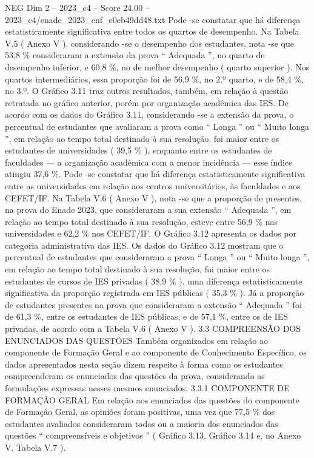 \begin{textsample}{NEG Dim 2 – 2023\_c4 – Score 24.00 – 2023\_c4/enade\_2023\_enf\_e0eb49dd48.txt}
Pode -se constatar que há diferença estatisticamente significativa entre todos os quartos de desempenho.
Na Tabela V.5 ( Anexo V ), considerando -se o desempenho dos estudantes, nota -se que 53,8 \% consideraram a extensão da prova “ Adequada ”, no quarto de desempenho inferior, e 60,8 \%, no de melhor desempenho ( quarto superior ).
Nos quartos intermediários, essa proporção foi de 56,9 \%, no 2.º quarto, e de 58,4 \%, no 3.º.
O Gráfico 3.11 traz outros resultados, também, em relação à questão retratada no gráfico anterior, porém por organização acadêmica das IES.
De acordo com os dados do Gráfico 3.11, considerando -se a extensão da prova, o percentual de estudantes que avaliaram a prova como “ Longa ” ou “ Muito longa ”, em relação ao tempo total destinado à sua resolução, foi maior entre os estudantes de universidades ( 39,5 \% ), enquanto entre os estudantes de faculdades — a organização acadêmica com a menor incidência — esse índice atingiu 37,6 \%.
Pode -se constatar que há diferença estatisticamente significativa entre as universidades em relação aos centros universitários, às faculdades e aos CEFET/IF.
Na Tabela V.6 ( Anexo V ), nota -se que a proporção de presentes, na prova do Enade 2023, que consideraram a sua extensão “ Adequada ”, em relação ao tempo total destinado à sua resolução, esteve entre 56,9 \% nas universidades e 62,2 \% nos CEFET/IF.
O Gráfico 3.12 apresenta os dados por categoria administrativa das IES.
Os dados do Gráfico 3.12 mostram que o percentual de estudantes que consideraram a prova “ Longa ” ou “ Muito longa ”, em relação ao tempo total destinado à sua resolução, foi maior entre os estudantes de cursos de IES privadas ( 38,9 \% ), uma diferença estatisticamente significativa da proporção registrada em IES públicas ( 35,3 \% ).
Já a proporção de estudantes presentes na prova que consideraram a extensão “ Adequada ” foi de 61,3 \%, entre os estudantes de IES públicas, e de 57,1 \%, entre os de IES privadas, de acordo com a Tabela V.6 ( Anexo V ). 3.3 COMPREENSÃO DOS ENUNCIADOS DAS QUESTÕES Também organizados em relação ao componente de Formação Geral e ao componente de Conhecimento Específico, os dados apresentados nesta seção dizem respeito à forma como os estudantes compreenderam os enunciados das questões da prova, considerando as formulações expressas nesses mesmos enunciados. 3.3.1 COMPONENTE DE FORMAÇÃO GERAL Em relação aos enunciados das questões do componente de Formação Geral, as opiniões foram positivas, uma vez que 77,5 \% dos estudantes avaliados consideraram todos ou a maioria dos enunciados das questões “ compreensíveis e objetivos ” ( Gráfico 3.13, Gráfico 3.14 e, no Anexo V, Tabela V.7 ).

\end{textsample}

